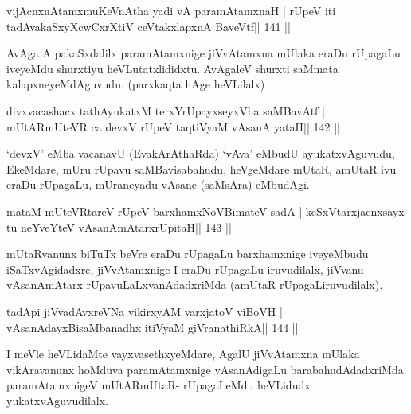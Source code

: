 
\begin{shl}
vijAcnxnAtamxmuKeVnAtha yadi vA paramAtamxnaH |
rUpeV iti tadA\s vakaSxyXcwCxrXtiV ceVtakxlapxnA BaveVtf\hfill || 141 ||
\end{shl}

\begin{artha}
AvAga A pakaSxdalilx paramAtamxnige jiVvAtamxna mUlaka eraDu rUpagaLu
iveyeMdu shurxtiyu heVLutatxlididxtu. AvAgaleV shurxti saMmata
kalapxneyeMdAguvudu. (parxkaqta hAge heVLilalx)
\end{artha}

\begin{shl}
divxvacashacx tathA\s yukatxM terxYrUpayxseyxVha saMBavAtf |
mUtARmUteVR ca devxV rUpeV taqtiVyaM vAsanA yataH\hfill || 142 ||
\end{shl}

\begin{artha}
`devxV' eMba vacanavU (EvakArAthaRda) `vAva' eMbudU ayukatxvAguvudu,   EkeMdare, mUru rUpavu saMBavisabahudu, heVgeMdare mUtaR, amUtaR ivu   eraDu rUpagaLu, mUraneyadu vAsane (saMsAra) eMbudAgi.
\end{artha}



\begin{shl}
mataM mUteVRtareV rUpeV barxhamxNoV\s BimateV sadA |
keSxVtarxjacnxsayx tu neYveYteV vAsanAmAtarxrUpitaH\hfill || 143 ||
\end{shl}

\begin{artha}
mUtaRvanunx biTuTx beVre eraDu rUpagaLu barxhamxnige iveyeMbudu iSaTxvAgidadxre, jiVvAtamxnige I eraDu rUpagaLu iruvudilalx, jiVvanu vAsanAmAtarx rUpavuLaLxvanAdadxriMda (amUtaR rUpagaLiruvudilalx).
\end{artha}

\begin{shl}
tadA\s pi jiVvadAvxreVNa vikirxyAM varxjatoV viBoVH |
vAsanAdayxBisaMbanadhx itiVyaM giVranathiRkA\hfill || 144 ||
\end{shl}

\begin{artha}
I meVle heVLidaMte vayxvasethxyeMdare, AgalU jiVvAtamxna mUlaka vikAravanunx hoMduva paramAtamxnige vAsanAdigaLu barabahudAdadxriMda paramAtamxnigeV mUtARmUtaR- rUpagaLeMdu heVLidudx yukatxvAguvudilalx.
\end{artha}

